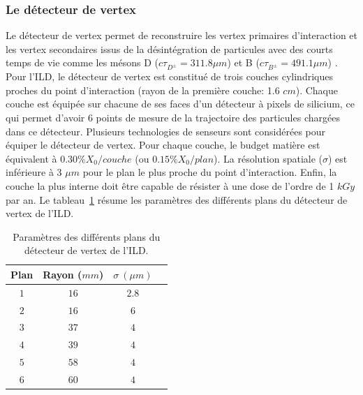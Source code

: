 \subsubsection{Le détecteur de vertex}
Le détecteur de vertex permet de reconstruire les vertex primaires d'interaction et les vertex secondaires issus de la désintégration de particules avec des courts temps de vie comme les mésons D ($c\tau_{D^{\pm}}=311.8\mu m$) et B ($c\tau_{B^{\pm}}=491.1\mu m$) \cite{pdg}. Pour l'ILD, le détecteur de vertex est constitué de trois couches cylindriques proches du point d'interaction (rayon de la première couche: 1.6 $cm$). Chaque couche est équipée sur chacune de ses faces d'un détecteur à pixels de silicium, ce qui permet d'avoir 6 points de mesure de la trajectoire des particules chargées dans ce détecteur. Plusieurs technologies de senseurs sont considérées pour équiper le détecteur de vertex. Pour chaque couche, le budget matière est équivalent à $0.30\% X_0/couche$ (ou $0.15\% X_0/plan$). La résolution spatiale ($\sigma$) est inférieure à 3 $\mu m$ pour le plan le plus proche du point d'interaction. Enfin, la couche la plus interne doit être capable de résister à une dose de l'ordre de 1 $kGy$ par an. Le tableau~\ref{tab.vtx-param} résume les paramètres des différents plans du détecteur de vertex de l'ILD.
\begin{table}[!ht]
  \begin{center}
    \begin{tabular}{c|c|c|c}
      \rowcolor{black!20!white} Plan & Rayon ($mm$) & $\sigma~(\mu m)$ \\
      \hline
      \rowcolor{black!5!white} $1$ & $16$ & $2.8$ \\
      \rowcolor{black!5!white} $2$ & $16$ & $6$ \\
      \hline
      \rowcolor{black!5!white} $3$ & $37$ & $4$ \\
      \rowcolor{black!5!white} $4$ & $39$ & $4$ \\
      \hline
      \rowcolor{black!5!white} $5$ & $58$ & $4$ \\
      \rowcolor{black!5!white} $6$ & $60$ & $4$ \\
    \end{tabular}
  \end{center}  
  \caption{Paramètres des différents plans du détecteur de vertex de l'ILD.}
  \label{tab.vtx-param}
\end{table}


